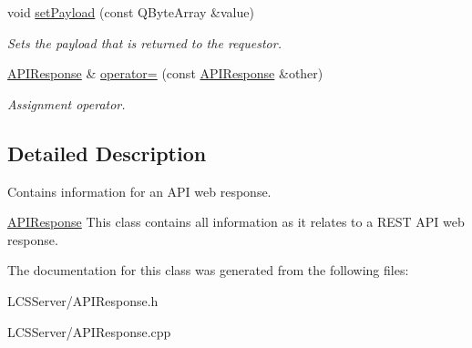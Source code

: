 \begin{DoxyCompactItemize}
void \hyperlink{class_a_p_i_response_a7b36f0565b798ad4740f83b58488f079}{set\+Payload} (const Q\+Byte\+Array \&value)
\begin{DoxyCompactList}\small\item\em Sets the payload that is returned to the requestor. \end{DoxyCompactList}\item 
\mbox{\label{class_a_p_i_response_a6c757d09db4b79b845b4ecc699c87905}} 
\hyperlink{class_a_p_i_response}{A\+P\+I\+Response} \& \hyperlink{class_a_p_i_response_a6c757d09db4b79b845b4ecc699c87905}{operator=} (const \hyperlink{class_a_p_i_response}{A\+P\+I\+Response} \&other)
\begin{DoxyCompactList}\small\item\em Assignment operator. \end{DoxyCompactList}\end{DoxyCompactItemize}


\subsection{Detailed Description}
Contains information for an A\+PI web response. 

\hyperlink{class_a_p_i_response}{A\+P\+I\+Response} This class contains all information as it relates to a R\+E\+ST A\+PI web response. 

The documentation for this class was generated from the following files\+:\begin{DoxyCompactItemize}
\item 
L\+C\+S\+Server/A\+P\+I\+Response.\+h\item 
L\+C\+S\+Server/A\+P\+I\+Response.\+cpp\end{DoxyCompactItemize}
